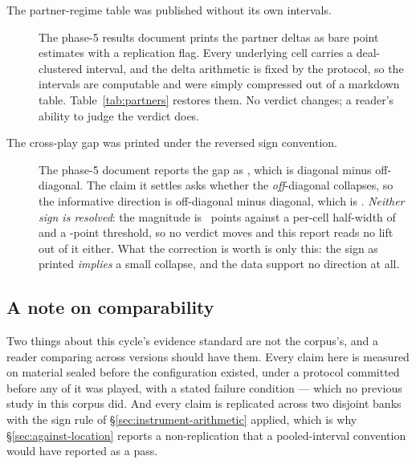 \begin{description}
\item[The partner-regime table was published without its own intervals.]
  \label{sec:corrections-intervals}
  The phase-5 results document prints the partner deltas as bare point estimates with a
  replication flag. Every underlying cell carries a deal-clustered interval, and the delta arithmetic
  is fixed by the protocol, so the intervals are computable and were simply compressed out of a
  markdown table. Table~\ref{tab:partners} restores them. No verdict changes; a reader's ability to
  judge the verdict does.

\item[The cross-play gap was printed under the reversed sign convention.] The phase-5 document reports the gap as \vsevenXpGapRecorded{}, which is diagonal minus
  off-diagonal. The claim it settles asks whether the \emph{off}-diagonal collapses, so the informative direction is off-diagonal minus diagonal, which is \vsevenXpGap{}.
  \emph{Neither sign is resolved}: the magnitude is \vsevenXpGapAbs{}~points against a per-cell
  half-width of \vsevenXpHalfWidth{} and a \vsevenStwoThreshold{}-point threshold, so no verdict
  moves and this report reads no lift out of it either. What the correction is worth is only this:
  the sign as printed \emph{implies} a small collapse, and the data support no direction at all.

\end{description}

\subsection{A note on comparability}
\label{sec:corrections-comparability}

Two things about this cycle's evidence standard are not the corpus's, and a reader comparing across
versions should have them. Every claim here is measured on material sealed before the configuration
existed, under a protocol committed before any of it was played, with a stated failure condition ---
which no previous study in this corpus did. And every claim is replicated across two disjoint banks
with the sign rule of \S\ref{sec:instrument-arithmetic} applied, which is why
\S\ref{sec:against-location} reports a non-replication that a pooled-interval convention would have
reported as a pass.
